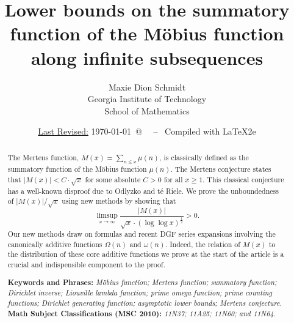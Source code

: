 \documentclass[11pt,reqno,a4letter]{article}
\title{
       \LARGE{
       Lower bounds on the summatory function of the M\"obius function along infinite subsequences 
       } 
}
\author{{\Large Maxie Dion Schmidt} \\ 
        {\normalsize Georgia Institute of Technology} \\[0.025cm] 
        {\normalsize School of Mathematics} 
}
\date{\small\underline{Last Revised:} \today \ @\ \hhmmsstime{} \ -- \ Compiled with \LaTeX2e}
\numberwithin{figure}{section}
\numberwithin{table}{section}
\theoremstyle{plain}
\numberwithin{theorem}{section}
\theoremstyle{definition}
\begin{document}
 

\maketitle

\begin{abstract} 
The Mertens function, $M(x) = \sum_{n \leq x} \mu(n)$, is classically 
defined as the summatory function of the M\"obius function $\mu(n)$. 
The Mertens conjecture states that $|M(x)| < C \cdot \sqrt{x}$ for some absolute $C > 0$ for all 
$x \geq 1$. 
This classical conjecture has a well-known disproof due to 
Odlyzko and t\'{e} Riele. 
We prove the unboundedness of $|M(x)| / \sqrt{x}$ using new methods by showing that 
$$\limsup_{x \rightarrow \infty} \frac{|M(x)|}{\sqrt{x} \cdot (\log\log x)^{\frac{1}{2}}} > 0.$$ 
Our new methods draw on formulas and recent DGF series expansions involving the canonically 
additive functions $\Omega(n)$ and $\omega(n)$. 
Indeed, the relation of $M(x)$ to the distribution of these core additive functions 
we prove at the start of the article is a crucial and indispensible component to the proof. 

\bigskip 
\noindent
\textbf{Keywords and Phrases:} {\it M\"obius function; Mertens function; summatory function; 
                                    Dirichlet inverse; Liouville lambda function; prime omega function; 
                                    prime counting functions; Dirichlet generating function; 
                                    asymptotic lower bounds; Mertens conjecture. } \\ 
\textbf{Math Subject Classifications (MSC 2010):} {\it 11N37; 11A25; 11N60; and 11N64. } 
\end{abstract} 
\end{document}
